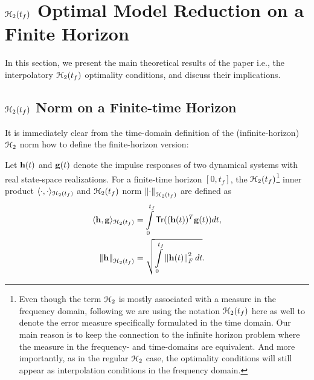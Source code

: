 \documentclass[twocolumn]{autart}
\begin{document}
\section{$\EuScript{H}_2(t_f)$ Optimal Model Reduction on a Finite Horizon}  \label{sec:main} 
In this section, we present  the main theoretical results of the paper i.e., the interpolatory $\EuScript{H}_2(t_f)$  optimality conditions, and discuss their implications.

\subsection{$\EuScript{H}_2(t_f)$ Norm on a Finite-time Horizon}
It is immediately clear from the time-domain definition of the (infinite-horizon) $\EuScript{H}_2$ norm how to define the finite-horizon version:
\begin{Definition}\label{innerh2}
Let $\mathbf{h}(t)$ and $\mathbf{g}(t)$ denote the impulse responses of two dynamical systems with real state-space realizations.  
For a finite-time horizon 
$[0,t_f]$, the $\EuScript{H}_2(t_f)$\footnote{Even though the term  $\EuScript{H}_2$ is mostly associated with a measure in the frequency domain, following \cite{RedK17,GoyR17} we are using the notation $\EuScript{H}_2(t_f)$ here as well to denote the error measure specifically formulated in the time domain. Our main reason is to keep the connection to the infinite horizon problem where the measure in the frequency- and time-domains are equivalent. And more importantly, as in the regular $\EuScript{H}_2$ case, the optimality conditions will still appear as interpolation conditions in the frequency domain. 
}
   inner product $\langle \cdot, \cdot \rangle_{\EuScript{H}_2(t_f)}$ 
and $\EuScript{H}_2(t_f)$ norm $\left\lVert\cdot\right\rVert_{\EuScript{H}_2(t_f)}$ are defined as  
\begin{align*}
\langle \h, \g \rangle_{\ch_2(\tf)} &=\int_0^{\tf} \mathsf{Tr}( (\h(t))^T \g(t)) dt, \\%
\norm{\h}_{\ch_2(\tf)} &=\sqrt{\int_0^{\tf} \norm{\h(t)}_F^2 dt}.
\end{align*}

\end{Definition}

\end{document}
